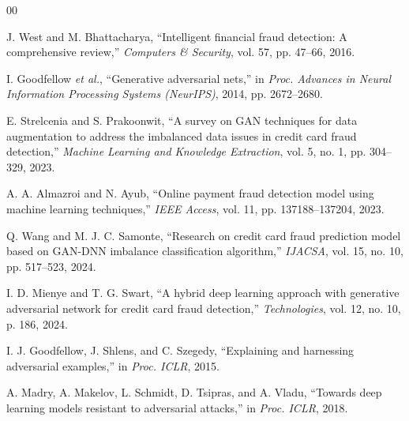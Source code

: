 \documentclass[conference]{IEEEtran}
\begin{document}
\begin{thebibliography}{00}

J. West and M. Bhattacharya, ``Intelligent financial fraud detection: A comprehensive review,'' \textit{Computers \& Security}, vol. 57, pp. 47--66, 2016.

I. Goodfellow \textit{et al.}, ``Generative adversarial nets,'' in \textit{Proc. Advances in Neural Information Processing Systems (NeurIPS)}, 2014, pp. 2672--2680.

E. Strelcenia and S. Prakoonwit, ``A survey on GAN techniques for data augmentation to address the imbalanced data issues in credit card fraud detection,'' \textit{Machine Learning and Knowledge Extraction}, vol. 5, no. 1, pp. 304--329, 2023.

A. A. Almazroi and N. Ayub, ``Online payment fraud detection model using machine learning techniques,'' \textit{IEEE Access}, vol. 11, pp. 137188--137204, 2023.

Q. Wang and M. J. C. Samonte, ``Research on credit card fraud prediction model based on GAN-DNN imbalance classification algorithm,'' \textit{IJACSA}, vol. 15, no. 10, pp. 517--523, 2024.

I. D. Mienye and T. G. Swart, ``A hybrid deep learning approach with generative adversarial network for credit card fraud detection,'' \textit{Technologies}, vol. 12, no. 10, p. 186, 2024.

I. J. Goodfellow, J. Shlens, and C. Szegedy, ``Explaining and harnessing adversarial examples,'' in \textit{Proc. ICLR}, 2015.

A. Madry, A. Makelov, L. Schmidt, D. Tsipras, and A. Vladu, ``Towards deep learning models resistant to adversarial attacks,'' in \textit{Proc. ICLR}, 2018.

\end{thebibliography}
\end{document}

